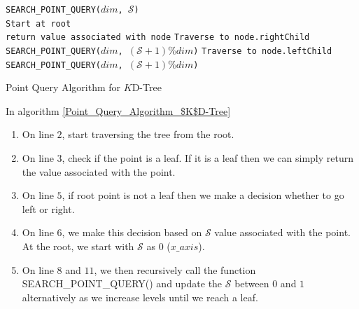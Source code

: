 \begin{algorithm}[H]
    \SetAlgoLined
    \texttt{SEARCH\_POINT\_QUERY($dim$, $\mathcal{S}$)}\\
    \texttt{Start at root}\\
        {
            \texttt{return value associated with node}
        }
        {
            {\texttt{Traverse to node.rightChild}\\ \texttt{SEARCH\_POINT\_QUERY($dim$, $(\mathcal{S}+1) \% dim$)}}
        {\texttt{Traverse to node.leftChild}\\ 
        \texttt{SEARCH\_POINT\_QUERY($dim$, $(\mathcal{S}+1) \% dim$)}}
        }
    \caption{Point Query Algorithm for $K$D-Tree}
    \label{Point_Query_Algorithm_$K$D-Tree}
\end{algorithm}

In algorithm \ref{Point_Query_Algorithm_$K$D-Tree} 

\begin{enumerate}

    \item On line $2$, start traversing the tree from the root. 
    
    \item On line $3$, check if the point is a leaf. If it is a leaf then we can simply return the value associated with the point.
    
    \item On line $5$, if root point is not a leaf then we make a decision whether to go left or right.
    
    \item On line $6$, we make this decision based on $\mathcal{S}$ value associated with the point. At the root, we start with $\mathcal{S}$ as $0$ ($x\_axis$). 
    \item On line $8$ and $11$, we then recursively call the function SEARCH\_POINT\_QUERY() and update the $\mathcal{S}$ between $0$ and $1$ alternatively as we increase levels until we reach a leaf.

\end{enumerate}

